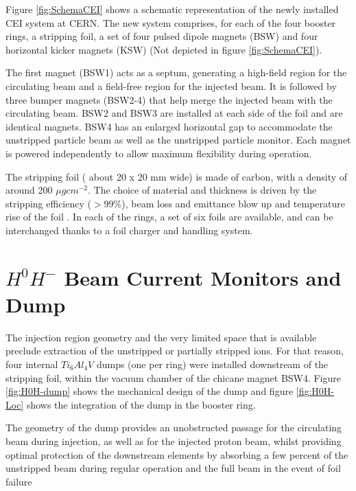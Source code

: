 Figure \ref{fig:SchemaCEI} shows a schematic representation of the newly installed CEI system at CERN. The new system comprises, for each of the four booster rings, a stripping foil, a set of four pulsed dipole magnets (BSW) \parencite[][]{ref:BSW} and four horizontal kicker magnets (KSW) \parencite[][]{ref:KSW} (Not depicted in figure \ref{fig:SchemaCEI}). 

The first magnet (BSW1) acts as a septum, generating a high-field region for the circulating beam and a field-free region for the injected \hm beam. It is followed by three bumper magnets (BSW2-4) that help merge the injected beam with the circulating beam. BSW2 and BSW3 are installed at each side of the foil and are identical magnets. BSW4 has an enlarged horizontal gap to accommodate the unstripped particle beam as well as the unstripped particle monitor. Each magnet is powered independently to allow maximum flexibility during operation. 

The stripping foil ( about 20 x 20 mm wide) is made of carbon, with a density of around 200 $\mu g cm^{-2}$. The choice of material and thickness is driven by the stripping efficiency ($> 99 \%$), beam loss and emittance blow up and temperature rise of the foil \parencite[][]{ref:StrippingFoil}. In each of the rings, a set of six foils are available, and can be interchanged thanks to a foil charger and handling system.

\section{$H^{0}H^{-}$  Beam Current Monitors and Dump}


The injection region geometry and the very limited space that is available preclude extraction of the unstripped or partially stripped ions. For that reason, four internal $Ti_{6}Al_{4}V$ dumps (one per ring) were installed downstream of the stripping foil, within the vacuum chamber of the chicane magnet BSW4. Figure \ref{fig:H0H-dump} shows the mechanical design of the dump and figure \ref{fig:H0H-Loc} shows the integration of the dump in the booster ring. 

The geometry of the dump provides an unobstructed passage for the circulating beam during injection, as well as for the injected proton beam, whilst providing optimal protection of the downstream elements by absorbing a few percent of the unstripped beam during regular operation and the full beam in the event of foil failure

